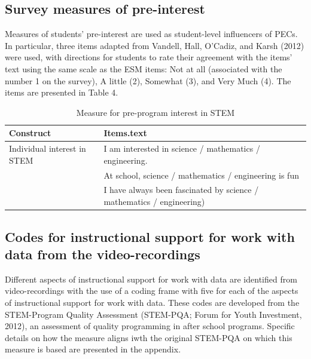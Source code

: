 \documentclass[]{msu-thesis}
\theoremstyle{definition}
\theoremstyle{definition}
\theoremstyle{definition}
\theoremstyle{remark}
\begin{document}
\subsection{Survey measures of
pre-interest}\label{survey-measures-of-pre-interest}

Measures of students' pre-interest are used as student-level influencers
of PECs. In particular, three items adapted from Vandell, Hall, O'Cadiz,
and Karsh (2012) were used, with directions for students to rate their
agreement with the items' text using the same scale as the ESM items:
Not at all (associated with the number 1 on the survey), A little (2),
Somewhat (3), and Very Much (4). The items are presented in Table 4.

\begin{table}

\caption{\label{tab:unnamed-chunk-6}Measure for pre-program interest in STEM}
\centering
\begin{tabular}[t]{ll}
\toprule
Construct & Items.text\\
\midrule
Individual interest in STEM & I am interested in science / mathematics / engineering.\\
 & At school, science / mathematics / engineering is fun\\
 & I have always been fascinated by science / mathematics / engineering)\\
\bottomrule
\end{tabular}
\end{table}

\subsection{Codes for instructional support for work with data from the
video-recordings}\label{codes-for-instructional-support-for-work-with-data-from-the-video-recordings}

Different aspects of instructional support for work with data are
identified from video-recordings with the use of a coding frame with
five for each of the aspects of instructional support for work with
data. These codes are developed from the STEM-Program Quality Assessment
(STEM-PQA; Forum for Youth Investment, 2012), an assessment of quality
programming in after school programs. Specific details on how the
measure aligns iwth the original STEM-PQA on which this measure is based
are presented in the appendix.
\end{document}
